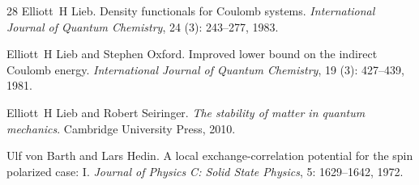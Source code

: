\documentclass[final,reqno]{amsart}
\theoremstyle{remark}
\begin{document}
\begin{thebibliography}{28}
Elliott~H Lieb.
\newblock Density functionals for {C}oulomb systems.
\newblock \emph{International Journal of Quantum Chemistry}, 24
  (3): 243--277, 1983.

Elliott~H Lieb and Stephen Oxford.
\newblock Improved lower bound on the indirect {C}oulomb energy.
\newblock \emph{International Journal of Quantum Chemistry}, 19
  (3): 427--439, 1981.

Elliott~H Lieb and Robert Seiringer.
\newblock \emph{The stability of matter in quantum mechanics}.
\newblock Cambridge University Press, 2010.

Ulf von Barth and Lars Hedin.
\newblock A local exchange-correlation potential for the spin polarized case:
  {I}.
\newblock \emph{Journal of Physics C: Solid State Physics}, 5:
  1629--1642, 1972.

\end{thebibliography}
\end{document}
